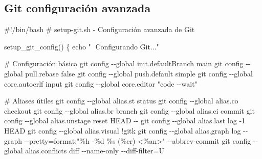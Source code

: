 \documentclass[
  11pt,
  letterpaper,
  oneside,
  openany]{scrbook}
\newenvironment{Shaded}{}{}
\newcommand{\AttributeTok}[1]{\textcolor[rgb]{0.84,0.23,0.29}{#1}}
\newcommand{\BuiltInTok}[1]{\textcolor[rgb]{0.84,0.23,0.29}{#1}}
\newcommand{\CommentTok}[1]{\textcolor[rgb]{0.42,0.45,0.49}{#1}}
\newcommand{\FunctionTok}[1]{\textcolor[rgb]{0.44,0.26,0.76}{#1}}
\newcommand{\KeywordTok}[1]{\textcolor[rgb]{0.84,0.23,0.29}{#1}}
\newcommand{\NormalTok}[1]{\textcolor[rgb]{0.14,0.16,0.18}{#1}}
\newcommand{\StringTok}[1]{\textcolor[rgb]{0.01,0.18,0.38}{#1}}
\begin{document}
\subsection{Git configuración
avanzada}\label{git-configuraciuxf3n-avanzada}

\begin{Shaded}
\begin{Highlighting}[]
\CommentTok{\#!/bin/bash}
\CommentTok{\# setup{-}git.sh {-} Configuración avanzada de Git}

\FunctionTok{setup\_git\_config()} \KeywordTok{\{}
    \BuiltInTok{echo} \StringTok{"🔧 Configurando Git..."}
    
    \CommentTok{\# Configuración básica}
    \FunctionTok{git}\NormalTok{ config }\AttributeTok{{-}{-}global}\NormalTok{ init.defaultBranch main}
    \FunctionTok{git}\NormalTok{ config }\AttributeTok{{-}{-}global}\NormalTok{ pull.rebase false}
    \FunctionTok{git}\NormalTok{ config }\AttributeTok{{-}{-}global}\NormalTok{ push.default simple}
    \FunctionTok{git}\NormalTok{ config }\AttributeTok{{-}{-}global}\NormalTok{ core.autocrlf input}
    \FunctionTok{git}\NormalTok{ config }\AttributeTok{{-}{-}global}\NormalTok{ core.editor }\StringTok{"code {-}{-}wait"}
    
    \CommentTok{\# Aliases útiles}
    \FunctionTok{git}\NormalTok{ config }\AttributeTok{{-}{-}global}\NormalTok{ alias.st status}
    \FunctionTok{git}\NormalTok{ config }\AttributeTok{{-}{-}global}\NormalTok{ alias.co checkout}
    \FunctionTok{git}\NormalTok{ config }\AttributeTok{{-}{-}global}\NormalTok{ alias.br branch}
    \FunctionTok{git}\NormalTok{ config }\AttributeTok{{-}{-}global}\NormalTok{ alias.ci commit}
    \FunctionTok{git}\NormalTok{ config }\AttributeTok{{-}{-}global}\NormalTok{ alias.unstage }\StringTok{\textquotesingle{}reset HEAD {-}{-}\textquotesingle{}}
    \FunctionTok{git}\NormalTok{ config }\AttributeTok{{-}{-}global}\NormalTok{ alias.last }\StringTok{\textquotesingle{}log {-}1 HEAD\textquotesingle{}}
    \FunctionTok{git}\NormalTok{ config }\AttributeTok{{-}{-}global}\NormalTok{ alias.visual }\StringTok{\textquotesingle{}!gitk\textquotesingle{}}
    \FunctionTok{git}\NormalTok{ config }\AttributeTok{{-}{-}global}\NormalTok{ alias.graph }\StringTok{\textquotesingle{}log {-}{-}graph {-}{-}pretty=format:"\%h {-}\%d \%s (\%cr) \textless{}\%an\textgreater{}" {-}{-}abbrev{-}commit\textquotesingle{}}
    \FunctionTok{git}\NormalTok{ config }\AttributeTok{{-}{-}global}\NormalTok{ alias.conflicts }\StringTok{\textquotesingle{}diff {-}{-}name{-}only {-}{-}diff{-}filter=U\textquotesingle{}}
    

\end{Highlighting}
\end{Shaded}
\end{document}

